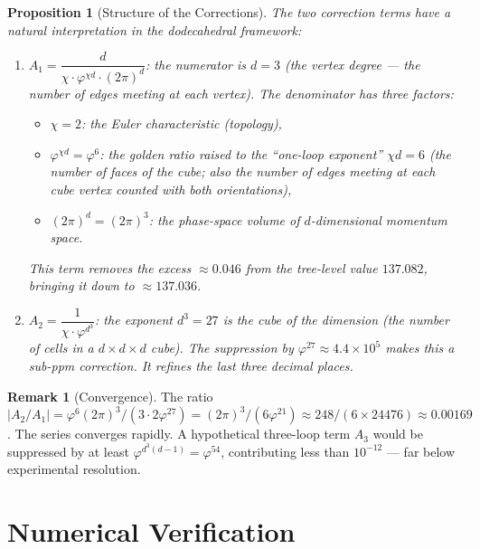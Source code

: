 \documentclass[11pt,a4paper]{article}
\theoremstyle{plain}
\newtheorem{proposition}[theorem]{Proposition}
\theoremstyle{definition}
\newtheorem{remark}[theorem]{Remark}
\newcommand{\vp}{\varphi}
\begin{document}
\begin{proposition}[Structure of the Corrections]\label{prop:corrections}
The two correction terms have a natural interpretation in the dodecahedral
framework:
\begin{enumerate}
  \item $A_1 = \dfrac{d}{\chi \cdot \vp^{\chi d} \cdot (2\pi)^d}$:
    the numerator is $d = 3$ (the vertex degree --- the number of edges
    meeting at each vertex).  The denominator has three factors:
    \begin{itemize}[nosep]
      \item $\chi = 2$: the Euler characteristic (topology),
      \item $\vp^{\chi d} = \vp^6$: the golden ratio raised to the
        ``one-loop exponent'' $\chi d = 6$ (the number of faces of the
        cube; also the number of edges meeting at each cube vertex counted
        with both orientations),
      \item $(2\pi)^d = (2\pi)^3$: the phase-space volume of
        $d$-dimensional momentum space.
    \end{itemize}
    This term removes the excess $\approx 0.046$ from the tree-level
    value $137.082$, bringing it down to $\approx 137.036$.

  \item $A_2 = \dfrac{1}{\chi \cdot \vp^{d^3}}$:
    the exponent $d^3 = 27$ is the cube of the dimension (the number of
    cells in a $d \times d \times d$ cube).  The suppression by
    $\vp^{27} \approx 4.4 \times 10^5$ makes this a sub-ppm correction.
    It refines the last three decimal places.
\end{enumerate}
\end{proposition}

\begin{remark}[Convergence]
The ratio $|A_2/A_1| = \vp^6(2\pi)^3 / (3 \cdot 2\vp^{27})
= (2\pi)^3 / (6\vp^{21}) \approx 248/(6 \times 24476) \approx 0.00169$.
The series converges rapidly.  A hypothetical three-loop term $A_3$
would be suppressed by at least $\vp^{d^3(d-1)} = \vp^{54}$, contributing
less than $10^{-12}$ --- far below experimental resolution.
\end{remark}

\section{Numerical Verification}\label{sec:verify}
\end{document}
